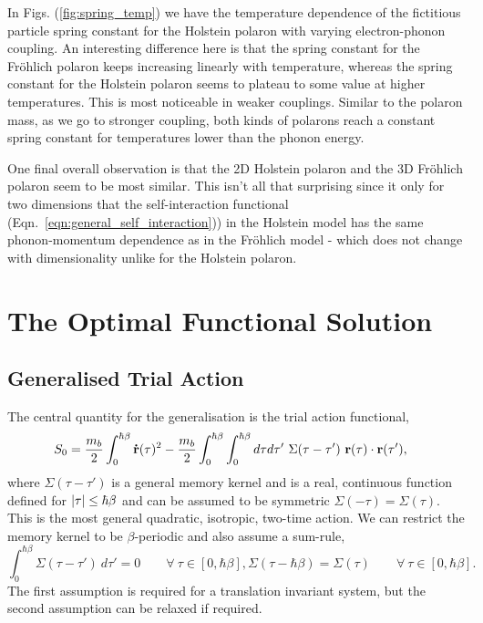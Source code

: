 In Figs. (\ref{fig:spring_temp}) we have the temperature dependence of the fictitious particle spring constant for the Holstein polaron with varying electron-phonon coupling. An interesting difference here is that the spring constant for the Fr\"ohlich polaron keeps increasing linearly with temperature, whereas the spring constant for the Holstein polaron seems to plateau to some value at higher temperatures. This is most noticeable in weaker couplings. Similar to the polaron mass, as we go to stronger coupling, both kinds of polarons reach a constant spring constant for temperatures lower than the phonon energy.

One final overall observation is that the 2D Holstein polaron and the 3D Fr\"ohlich polaron seem to be most similar. This isn't all that surprising since it only for two dimensions that the self-interaction functional (Eqn.~\ref{eqn:general_self_interaction})) in the Holstein model has the same phonon-momentum dependence as in the Fr\"ohlich model - which does not change with dimensionality unlike for the Holstein polaron.

\section{The Optimal Functional Solution}
\label{sec:chap-fourth-second}

\subsection{Generalised Trial Action}

The central quantity for the generalisation is the trial action functional,
\begin{equation} \label{eqn:generaltrial}
    \begin{aligned}
        S_0 &= \frac{m_b}{2} \int_0^{\hbar\beta} \vb{\Dot{r}}(\tau)^2 - \frac{m_b}{2} \int_0^{\hbar\beta} \int_0^{\hbar\beta} d\tau d\tau'\ \Sigma(\tau - \tau')\ \vb{r}(\tau) \cdot \vb{r}(\tau'),
    \end{aligned}
\end{equation}
where $\Sigma(\tau - \tau')$ is a general memory kernel and is a real, continuous function defined for $\abs{\tau} \leq \hbar\beta$ and can be assumed to be symmetric $\Sigma(-\tau) = \Sigma(\tau)$. This is the most general quadratic, isotropic, two-time action. We can restrict the memory kernel to be $\beta$-periodic and also assume a sum-rule,
\begin{subequations}
    \begin{equation}
        \int_0^{\hbar\beta} \Sigma(\tau - \tau')\ d\tau' = 0 \qquad \forall\ \tau \in [0, \hbar\beta],
    \end{equation}
    \begin{equation}
        \Sigma(\tau - \hbar\beta) = \Sigma(\tau) \qquad \forall\ \tau \in [0, \hbar\beta].
    \end{equation}
\end{subequations}
The first assumption is required for a translation invariant system, but the second assumption can be relaxed if required. 

